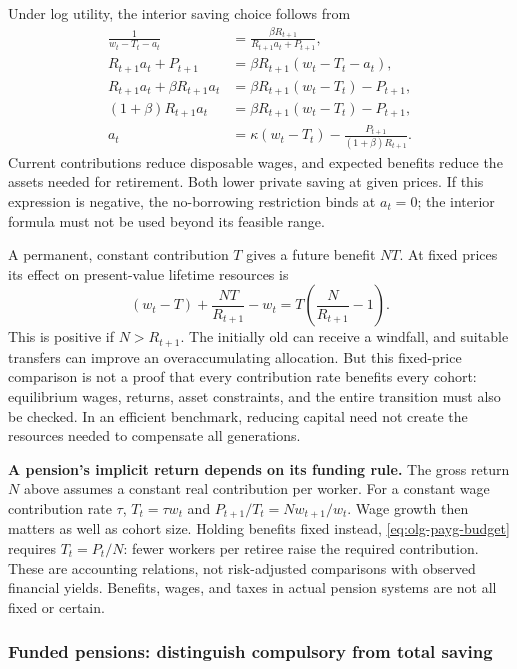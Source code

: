 Under log utility, the interior saving choice follows from
\begin{align}
\frac{1}{w_t-T_t-a_t}
&=\frac{\beta R_{t+1}}{R_{t+1}a_t+P_{t+1}},\\
R_{t+1}a_t+P_{t+1}
 &=\beta R_{t+1}(w_t-T_t-a_t),\\
R_{t+1}a_t+\beta R_{t+1}a_t
 &=\beta R_{t+1}(w_t-T_t)-P_{t+1},\\
(1+\beta)R_{t+1}a_t
&=\beta R_{t+1}(w_t-T_t)-P_{t+1},\\
a_t&=\kappa(w_t-T_t)
-\frac{P_{t+1}}{(1+\beta)R_{t+1}}.
\label{eq:olg-payg-saving}
\end{align}
Current contributions reduce disposable wages, and expected benefits reduce
the assets needed for retirement. Both lower private saving at given prices.
If this expression is negative, the no-borrowing restriction binds at $a_t=0$;
the interior formula must not be used beyond its feasible range.

A permanent, constant contribution $T$ gives a future benefit $NT$.
At fixed prices its effect on present-value lifetime resources is
\begin{equation}
(w_t-T)+\frac{NT}{R_{t+1}}-w_t
=T\left(\frac{N}{R_{t+1}}-1\right).
\end{equation}
This is positive if $N>R_{t+1}$. The initially old can receive a windfall,
and suitable transfers can improve an overaccumulating allocation. But this
fixed-price comparison is not a proof that every contribution rate benefits
every cohort: equilibrium wages, returns, asset constraints, and the entire
transition must also be checked. In an efficient benchmark, reducing capital
need not create the resources needed to compensate all generations.

\begin{blueblock}
\textbf{A pension's implicit return depends on its funding rule.}
The gross return $N$ above assumes a constant real contribution per worker.
For a constant wage contribution rate $\tau$, $T_t=\tau w_t$ and
$P_{t+1}/T_t=Nw_{t+1}/w_t$. Wage growth then matters as well as cohort size.
Holding benefits fixed instead, \eqref{eq:olg-payg-budget} requires
$T_t=P_t/N$: fewer workers per retiree raise the required contribution.
These are accounting relations, not risk-adjusted comparisons with observed
financial yields. Benefits, wages, and taxes in actual pension systems are
not all fixed or certain.
\end{blueblock}

\subsubsection{Funded pensions: distinguish compulsory from total saving}

